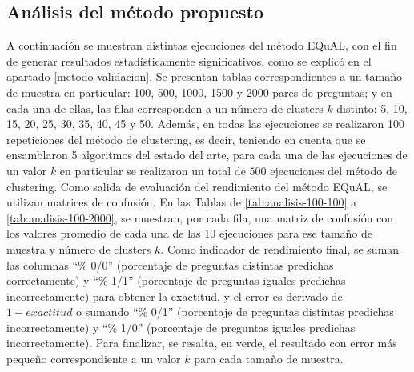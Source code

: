 \subsection{Análisis del método propuesto}\label{ss:analisismetodo}

A continuación se muestran distintas ejecuciones del método EQuAL, con el fin de generar resultados estadísticamente significativos, como se explicó en el apartado \ref{metodo-validacion}. Se presentan tablas correspondientes a un tamaño de muestra en particular: 100, 500, 1000, 1500 y 2000 pares de preguntas; y en cada una de ellas, las filas corresponden a un número de clusters \(k\) distinto: 5, 10, 15, 20, 25, 30, 35, 40, 45 y 50. Además, en todas las ejecuciones se realizaron 100 repeticiones del método de clustering, es decir, teniendo en cuenta que se ensamblaron 5 algoritmos del estado del arte, para cada una de las ejecuciones de un valor \(k\) en particular se realizaron un total de \(500\) ejecuciones del método de clustering. Como salida de evaluación del rendimiento del método EQuAL, se utilizan matrices de confusión. En las Tablas de \ref{tab:analisis-100-100} a \ref{tab:analisis-100-2000}, se muestran, por cada fila, una matriz de confusión con los valores promedio de cada una de las 10 ejecuciones para ese tamaño de muestra y número de clusters \(k\). Como indicador de rendimiento final, se suman las columnas “\% 0/0” (porcentaje de preguntas distintas predichas correctamente) y “\% 1/1” (porcentaje de preguntas iguales predichas incorrectamente) para obtener la exactitud, y el error es derivado de \(1 - exactitud\) o sumando “\% 0/1” (porcentaje de preguntas distintas predichas incorrectamente) y “\% 1/0” (porcentaje de preguntas iguales predichas incorrectamente). Para finalizar, se resalta, en verde, el resultado con error más pequeño correspondiente a un valor \(k\) para cada tamaño de muestra.

